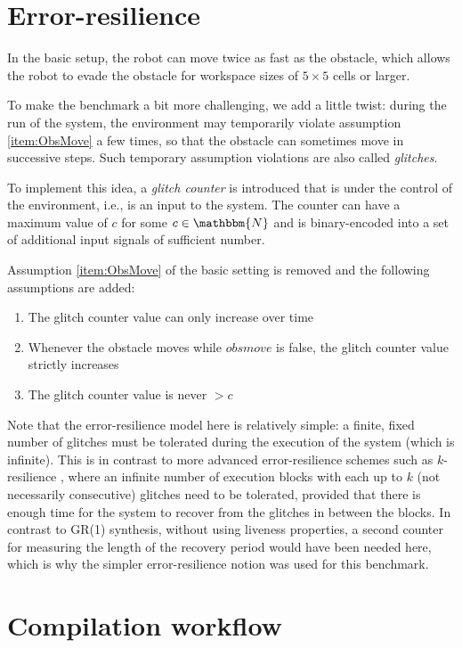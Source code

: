 \documentclass[a4paper,conference,10pt]{IEEEtran}
\newcommand{\NN}{\mathbbm{N}}
\begin{document}
\section{Error-resilience}

\noindent In the basic setup, the robot can move twice as fast as the obstacle, which allows the robot to evade the obstacle for workspace sizes of $5 \times 5$ cells or larger.

To make the benchmark a bit more challenging, we add a little twist: during the run of the system, the environment may temporarily violate assumption \ref{item:ObsMove} a few times, so that the obstacle can sometimes move in successive steps. Such temporary assumption violations are also called \emph{glitches}.

To implement this idea, a \emph{glitch counter} is introduced that is under the control of the environment, i.e., is an input to the system. The counter can have a maximum value of $c$ for some $c \in \NN$ and is binary-encoded into a set of additional input signals of sufficient number. 

Assumption \ref{item:ObsMove} of the basic setting is removed and the following assumptions are added:
\begin{enumerate}
\item The glitch counter value can only increase over time
\item Whenever the obstacle moves while $\mathit{obsmove}$ is false, the glitch counter value strictly increases
\item The glitch counter value is never $> c$
\end{enumerate}

Note that the error-resilience model here is relatively simple: a finite, fixed number of glitches must be tolerated during the execution of the system (which is infinite). 
This is in contrast to more advanced error-resilience schemes such as $k$-resilience \cite{DBLP:journals/corr/abs-1210-2449,EhlersTopcuHSCC2014}, where an infinite number of execution blocks with each up to $k$ (not necessarily consecutive) glitches need to be tolerated, provided that there is enough time for the system to recover from the glitches in between the blocks. In contrast to GR(1) synthesis, without using liveness properties, a second counter for measuring the length of the recovery period would have been needed here, which is why the simpler error-resilience notion was used for this benchmark.

\section{Compilation workflow}
\end{document}

